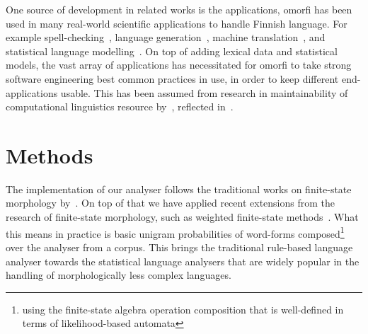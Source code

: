 \documentclass[a4paper,12pt]{article}
\begin{document}
One source of development in related works is the applications, omorfi has been
used in many real-world scientific applications to handle Finnish language.
For example spell-checking~\citep{pirinen2014weighted}, language
generation~\citep{toivanen2012corpus}, machine
translation~\citep{clifton2011combining,toral2015abumatran}, and statistical
language modelling~\citep{haverinen2013building,bohnet2013joint}. On top of
adding lexical data and statistical models, the vast array of applications has
necessitated for omorfi to take strong software engineering best common
practices in use, in order to keep different end-applications usable. This has
been assumed from research in maintainability of computational linguistics
resource by~\citet{maxwell}, reflected in~\citet{pirinen}.




\section{Methods}
\label{sec:methods}

The implementation of our analyser follows the traditional works on finite-state
morphology by~\citet{beesley2003finite}. On top of that we have applied recent
extensions from the research of finite-state morphology, such as weighted
finite-state methods~\citep{openfst,hfst2012}. What this means in practice is
basic unigram probabilities of word-forms composed\footnote{using the
    finite-state algebra operation composition that is well-defined in terms of
likelihood-based automata} over the analyser from a corpus.  This brings the
traditional rule-based language analyser towards the statistical language
analysers that are widely popular in the handling of morphologically less
complex languages.
\end{document}

